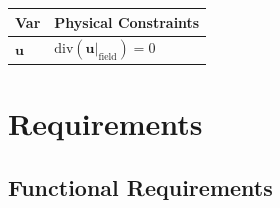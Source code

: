 \documentclass[12pt]{article}
\begin{document}
\begin{table}[!h]
\caption{Output Variables} \label{TblOutputVar}
\renewcommand{\arraystretch}{1.2}
\noindent \begin{longtable*}{l l} 
  \toprule
  \textbf{Var} & \textbf{Physical Constraints} \\
  \midrule 
  $\textbf{u}$ & $\text{div}(\mathbf{u}|_\text{field}) = 0$
  \\
  \bottomrule
\end{longtable*}
\end{table}


\section{Requirements} \label{Sec_req}



\subsection{Functional Requirements}
\end{document}
